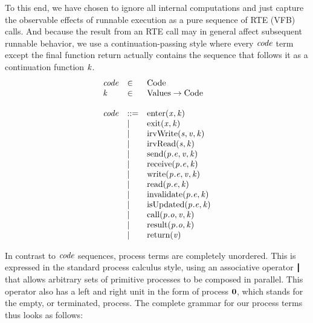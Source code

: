 \documentclass[twocolumn]{article}
\begin{document}
To this end, we have chosen to ignore all internal computations and just capture the observable effects of runnable execution as a pure sequence of RTE (VFB) calls. And because the result from an RTE call may in general affect subsequent runnable behavior, we use a continuation-passing style where every $\Code$ term except the final function return actually contains the sequence that follows it as a continuation function $\Cont$.
%
\[
\begin{array}{lll}
  \Code & \in & \text{Code}								\\
  \Cont & \in & \text{Values} \rightarrow \text{Code}   \\ \\
  \Code & ::= & \Enter{\V{X}}{\Cont}                \\
        & |   & \Exit{\V{X}}{\Cont}                 \\
        & |   & \IrvWrite{\V{S}}{\V{V}}{\Cont}          \\
        & |   & \IrvRead{\V{S}}{\Cont}              \\
        & |   & \Send{\Te{\V{E}}{\V{P}}}{\V{V}}{\Cont}      \\
        & |   & \Receive{\Te{\V{E}}{\V{P}}}{\Cont}      \\
        & |   & \Write{\Te{\V{E}}{\V{P}}}{\V{V}}{\Cont}     \\
        & |   & \Read{\Te{\V{E}}{\V{P}}}{\Cont}         \\
        & |   & \Invalidate{\Te{\V{E}}{\V{P}}}{\Cont}   \\
        & |   & \IsUpdated{\Te{\V{E}}{\V{P}}}{\Cont}    \\
        & |   & \Call{\To{\V{O}}{\V{P}}}{\V{V}}{\Cont}      \\
        & |   & \Result{\To{\V{O}}{\V{P}}}{\Cont}       \\
        & |   & \Return{\V{V}}                      \\
\end{array}
\]

In contrast to $\Code$ sequences, process terms are completely unordered. This is expressed in the standard process calculus style, using an associative operator $\Tpar{}{}$ that allows arbitrary sets of primitive processes to be composed in parallel. This operator also has a left and right unit in the form of process $\textbf{0}$, which stands for the empty, or terminated, process. The complete grammar for our process terms thus looks as follows:
\end{document}
